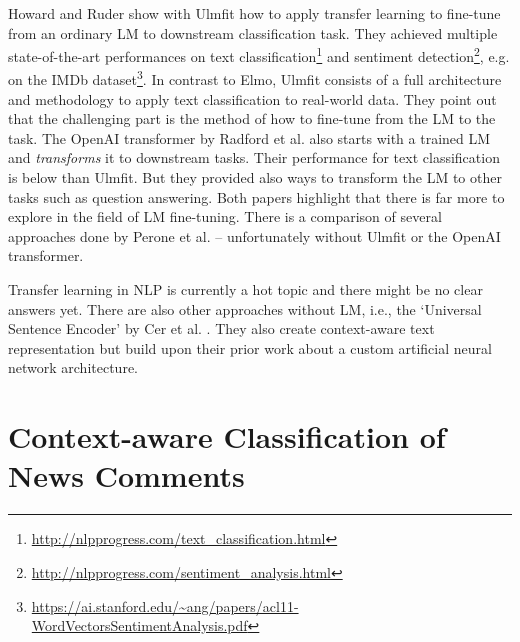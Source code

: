 Howard and Ruder show with Ulmfit \cite{howard_universal_2018} how to apply transfer learning to fine-tune from an ordinary LM to downstream classification task. They achieved multiple state-of-the-art performances on text classification\footnote{\url{http://nlpprogress.com/text_classification.html}} and sentiment detection\footnote{\url{http://nlpprogress.com/sentiment_analysis.html}}, e.g. on the IMDb dataset\footnote{\url{https://ai.stanford.edu/~ang/papers/acl11-WordVectorsSentimentAnalysis.pdf}}. In contrast to Elmo, Ulmfit consists of a full architecture and methodology to apply text classification to real-world data. They point out that the challenging part is the method of how to fine-tune from the LM to the task. The OpenAI transformer by Radford et al. \cite{radford2018improving} also starts with a trained LM and \textit{transforms} it to downstream tasks. Their performance for text classification is below than Ulmfit. But they provided also ways to transform the LM to other tasks such as question answering. Both papers highlight that there is far more to explore in the field of LM fine-tuning. There is a comparison of several approaches done by Perone et al. \cite{2018arXiv180606259P} -- unfortunately without Ulmfit or the OpenAI transformer.

Transfer learning in NLP is currently a hot topic and there might be no clear answers yet. There are also other approaches without LM, i.e., the `Universal Sentence Encoder' by Cer et al. \cite{cer2018universal}. They also create context-aware text representation but build upon their prior work about a custom artificial neural network architecture.


\section{Context-aware Classification of News Comments}
\label{sec:methods}




%


